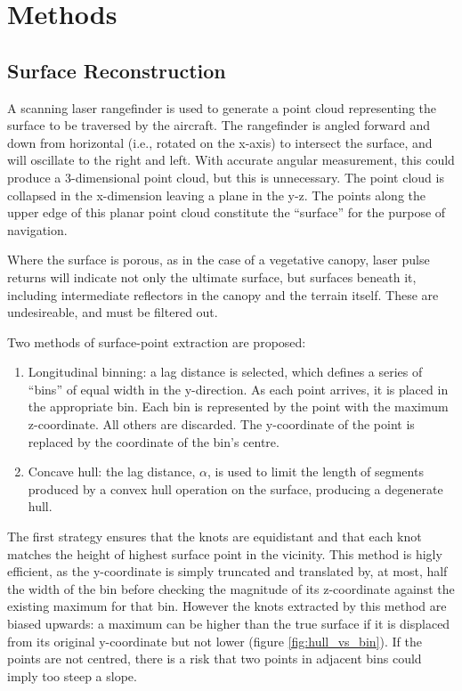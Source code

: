 \documentclass[doc]{apa6}
\begin{document}
\section{Methods}

\subsection{Surface Reconstruction}

A scanning laser rangefinder is used to generate a point cloud representing the surface to be traversed by the aircraft. The rangefinder is angled forward and down from horizontal (i.e., rotated on the x-axis) to intersect the surface, and will oscillate to the right and left. With accurate angular measurement, this could produce a 3-dimensional point cloud, but this is unnecessary. The point cloud is collapsed in the x-dimension leaving a plane in the y-z. The points along the upper edge of this planar point cloud constitute the ``surface'' for the purpose of navigation.

Where the surface is porous, as in the case of a vegetative canopy, laser pulse returns will indicate not only the ultimate surface, but surfaces beneath it, including intermediate reflectors in the canopy and the terrain itself. These are undesireable, and must be filtered out. 

Two methods of surface-point extraction are proposed: 

\begin{enumerate}
\item Longitudinal binning: a lag distance is selected, which defines a series of ``bins'' of equal width in the y-direction. As each point arrives, it is placed in the appropriate bin. Each bin is represented by the point with the maximum z-coordinate. All others are discarded. The y-coordinate of the point is replaced by the coordinate of the bin's centre.
\item Concave hull: the lag distance, $\alpha$, is used to limit the length of segments produced by a convex hull operation on the surface, producing a degenerate hull.
\end{enumerate}

The first strategy ensures that the knots are equidistant and that each knot matches the height of highest surface point in the vicinity. This method is higly efficient, as the y-coordinate is simply truncated and translated by, at most, half the width of the bin before checking the magnitude of its z-coordinate against the existing maximum for that bin. However the knots extracted by this method are biased upwards: a maximum can be higher than the true surface if it is displaced from its original y-coordinate but not lower (figure \ref{fig:hull_vs_bin}). If the points are not centred, there is a risk that two points in adjacent bins could imply too steep a slope.
\end{document}
